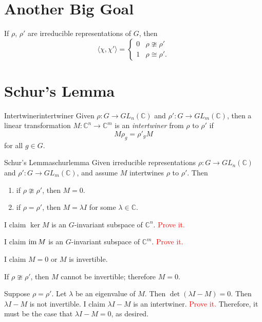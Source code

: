 
\section{Another Big Goal}

\begin{thm}{}{}
	If \(\rho\), \(\rho'\) are irreducible representations of \(G\), then \[
		\langle \chi, \chi' \rangle = 
		\begin{cases}
			0 & \rho \ncong \rho' \\
			1 & \rho \cong \rho'.
		\end{cases}
	\] 
\end{thm}

\section{Schur's Lemma}

\begin{defn}{Intertwiner}{intertwiner}
	Given \(\rho \colon G \to GL_n(\mathbb{C})\) and \(\rho' \colon G \to GL_m(\mathbb{C})\), then a linear transformation \(M \colon \mathbb{C}^n \to \mathbb{C}^m\) is an \emph{intertwiner} from \(\rho\) to \(\rho'\) if \[
		M\rho_g = \rho'_gM
	\] for all \(g \in G\).
\end{defn}

\begin{thm}{Schur's Lemma}{schurlemma}
	Given irreducible representations \(\rho \colon G \to GL_n(\mathbb{C})\) and \(\rho' \colon G \to GL_m(\mathbb{C})\), and assume \(M\) intertwines \(\rho\) to \(\rho'\). Then
	\begin{enumerate}
		\item if \(\rho \ncong \rho'\), then \(M = 0\).
		\item if \(\rho = \rho'\), then \(M = \lambda I\) for some \(\lambda \in \mathbb{C}\).
	\end{enumerate}
\end{thm}

\begin{dem}{}{}
	I claim \(\ker M\) is an \(G\)-invariant subspace of \(\mathbb{C}^n\). \textcolor{red}{Prove it.}

	I claim \(\operatorname{im} M\) is an \(G\)-invariant subspace of \(\mathbb{C}^m\). \textcolor{red}{Prove it.}

	I claim \(M = 0\) or \(M\) is invertible.

	If \(\rho \ncong \rho'\), then \(M\) cannot be invertible; therefore \(M = 0\).

	Suppose \(\rho = \rho'\).
	Let \(\lambda\) be an eigenvalue of \(M\).
	Then \(\det(\lambda I - M) = 0\).
	Then \(\lambda I - M\) is not invertible.
	I claim \(\lambda I - M\) is an intertwiner. \textcolor{red}{Prove it.}
	Therefore, it must be the case that \(\lambda I - M = 0\), as desired.
\end{dem}
